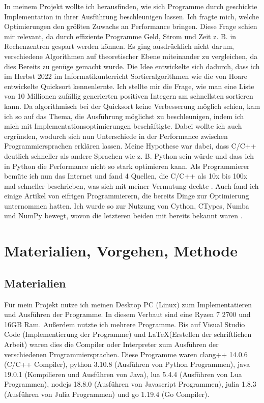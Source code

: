 \documentclass[10pt,a4paper]{article}
\begin{document}
In meinem Projekt wollte ich herausfinden, wie sich Programme durch geschickte Implementation
in ihrer Ausführung beschleunigen lassen. Ich fragte mich, welche Optimierungen den größten Zuwachs
an Performance bringen. Diese Frage schien mir relevant, da durch effiziente Programme Geld, Strom
und Zeit z. B. in Rechenzentren gespart werden können.
Es ging ausdrücklich nicht darum, verschiedene Algorithmen auf theoretischer Ebene
miteinander zu vergleichen, da dies Bereits zu genüge gemacht wurde. \cite{sortieralgorithmenwikipedia}
Die Idee entwickelte sich dadurch, dass ich im Herbst 2022 im Informatikunterricht
Sortieralgorithmen wie die von Hoare entwickelte Quicksort kennenlernte. \cite{quicksortwikipedia}
Ich stellte mir die Frage, wie man eine Liste von 10 Millionen zufällig generierten positiven Integern
am schnellsten sortieren kann. Da algorithmisch bei der Quicksort keine Verbesserung möglich schien,
kam ich so auf das Thema, die Ausführung möglichst zu beschleunigen, indem ich mich mit
Implementationsoptimierungen beschäftigte. Dabei wollte ich auch ergründen, wodurch sich nun Unterschiede
in der Performance zwischen Programmiersprachen erklären lassen. Meine Hypothese war dabei,
dass C/C++ deutlich schneller als andere Sprachen wie z. B. Python sein würde und dass
ich in Python die Performance nicht so stark optimieren kann.  Als Programmierer bemüte ich
nun das Internet und fand 4 Quellen, die C/C++ als 10x bis 100x mal schneller beschrieben,
was sich mit meiner Vermutung deckte \cite{pyengineeringvscpp} \cite{quorepythonvscpp}
\cite{pythonvscppforum} \cite{stopythonvscpp}.
Auch fand ich einige Artikel von eifrigen Programmierern, die bereits Dinge zur Optimierung
unternommen hatten. Ich wurde so zur Nutzung von Cython, CTypes, Numba und NumPy bewegt,
wovon die letzteren beiden mit bereits bekannt waren \cite{cythonctypes}.

\section{Materialien, Vorgehen, Methode}

\subsection{Materialien}
Für mein Projekt nutze ich meinen Desktop PC (Linux) zum Implementatieren und Ausführen der Programme.
In diesem Verbaut sind eine Ryzen 7 2700 und 16GB Ram. Außerdem nutzte ich mehrere Programme.
Bis auf Visual Studio Code (Implementierung der Programme) und \LaTeX (Erstellen der schriftlichen Arbeit)
waren dies die Compiler oder Interpreter zum Ausführen der verschiedenen Programmiersprachen.
Diese Programme waren clang++ 14.0.6 (C/C++ Compiler), python 3.10.8 (Ausführen von Python Programmen),
java 19.0.1 (Kompilieren und Ausführen von Java), lua 5.4.4 (Ausführen von Lua Programmen),
nodejs 18.8.0 (Ausführen von Javascript Programmen), julia 1.8.3 (Ausführen von Julia Programmen)
und go 1.19.4 (Go Compiler).
\end{document}
